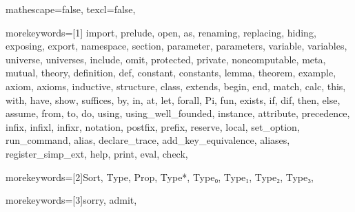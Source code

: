 
 {

mathescape=false,
texcl=false,

morekeywords=[1]{
import, prelude,
open, as, renaming, replacing, hiding, exposing, export,
namespace, section,
parameter, parameters, variable, variables, universe, universes, include, omit,
protected, private, noncomputable, meta, mutual, theory,
definition, def, constant, constants, lemma, theorem, example, axiom, axioms,
inductive, structure, class, extends,
begin, end, match, calc, this, with, have, show, suffices, by, in, at, let, forall, Pi, fun,
exists, if, dif, then, else, assume, from, to, do,
using, using_well_founded,
instance, attribute,
precedence, infix, infixl, infixr, notation, postfix, prefix,
reserve, local,
set_option, run_command,
alias, declare_trace, add_key_equivalence, aliases, register_simp_ext,
help, print, eval, check},

morekeywords=[2]{Sort, Type, Prop, Type*, Type₀, Type₁, Type₂, Type₃},

morekeywords=[3]{sorry, admit},



}
